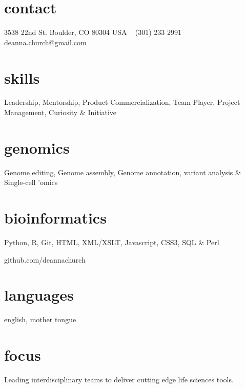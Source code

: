\documentclass[]{dmc-cv} %
\begin{document}


\begin{aside} %
\section{contact}
3538 22nd St.
Boulder, CO 80304
USA
~
(301) 233 2991
~
\href{mailto:deanna.church@gmail.com}{deanna.church@gmail.com}
\section{skills}
Leadership, Mentorship,
Product Commercialization,
Team Player,
Project Management,
Curiosity \& Initiative
\section{genomics}
Genome editing,
Genome assembly,
Genome annotation,
variant analysis \&
Single-cell 'omics
\section{bioinformatics}
Python, R, Git,
HTML, XML/XSLT, Javascript,
CSS3, SQL \& Perl

github.com/deannachurch

\section{languages}
english, mother tongue
\end{aside}

\section{focus}
Leading interdisciplinary teams to deliver cutting edge life sciences tools.

\end{document}
